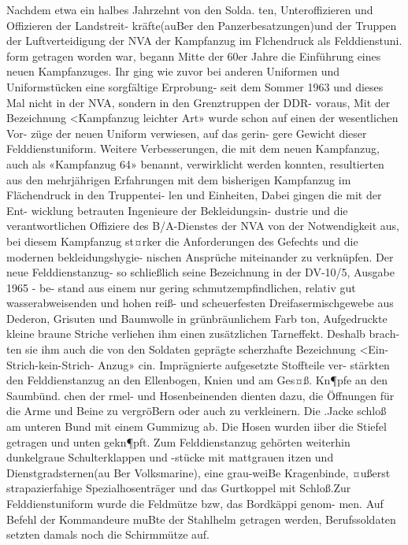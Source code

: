 

Nachdem etwa ein halbes Jahrzehnt von den Solda.
ten, Unteroffizieren und Offizieren der Landstreit-
kräfte(auBer den Panzerbesatzungen)und der
Truppen der Luftverteidigung der NVA der
Kampfanzug im Flchendruck als Felddienstuni.
form getragen worden war, begann Mitte der 60er Jahre die Einführung eines neuen Kampfanzuges.
Ihr ging wie zuvor bei anderen Uniformen und
Uniformstücken eine sorgfältige Erprobung- seit
dem Sommer 1963 und dieses Mal nicht in der
NVA, sondern in den Grenztruppen der DDR-
voraus, Mit der Bezeichnung <Kampfanzug leichter
Art» wurde schon auf einen der wesentlichen Vor-
züge der neuen Uniform verwiesen, auf das gerin-
gere Gewicht dieser Felddienstuniform.
Weitere Verbesserungen, die mit dem neuen
Kampfanzug, auch als «Kampfanzug 64» benannt, verwirklicht werden konnten, resultierten aus den
mehrjährigen Erfahrungen mit dem bisherigen
Kampfanzug im Flächendruck in den Truppentei-
len und Einheiten, Dabei gingen die mit der Ent-
wicklung betrauten Ingenieure der Bekleidungsin-
dustrie und die verantwortlichen Offiziere des
B/A-Dienstes der NVA von der Notwendigkeit aus,
bei diesem Kampfanzug st¤rker die Anforderungen
des Gefechts und die modernen bekleidungshygie-
nischen Ansprüche miteinander zu verknüpfen.
Der neue Felddienstanzug- so schließlich seine
Bezeichnung in der DV-10/5, Ausgabe 1965 - be-
stand aus einem nur gering schmutzempfindlichen,
relativ gut wasserabweisenden und hohen reiß- und
scheuerfesten Dreifasermischgewebe aus Dederon, Grisuten und Baumwolle in grünbräunlichem Farb
ton, Aufgedruckte kleine braune Striche verliehen
ihm einen zusätzlichen Tarneffekt. Deshalb brach-
ten sie ihm auch die von den Soldaten geprägte
scherzhafte Bezeichnung <Ein-Strich-kein-Strich-
Anzug» cin. Imprägnierte aufgesetzte Stoffteile ver-
stärkten den Felddienstanzug an den Ellenbogen,
Knien und am Ges¤ß. Kn¶pfe an den Saumbünd.
chen der rmel- und Hosenbeinenden dienten
dazu, die Öffnungen für die Arme und Beine zu
vergröBern oder auch zu verkleinern. Die .Jacke
schloß am unteren Bund mit einem Gummizug ab.
Die Hosen wurden iiber die Stiefel getragen und
unten gekn¶pft. Zum Felddienstanzug gehörten
weiterhin dunkelgraue Schulterklappen und -stücke mit mattgrauen itzen und Dienstgradsternen(au
Ber Volksmarine), eine grau-weiBe Kragenbinde,
¤ußerst strapazierfahige Spezialhosenträger und das
Gurtkoppel mit Schloß.Zur Felddienstuniform
wurde die Feldmütze bzw, das Bordkäppi genom-
men. Auf Befehl der Kommandeure muBte der
Stahlhelm getragen werden, Berufssoldaten setzten
damals noch die Schirmmütze auf.
